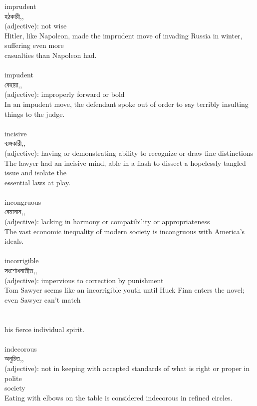 \documentclass{article}
\begin{document}
{imprudent}\\
{হঠকারী,,}\\
{(adjective): not wise\\Hitler, like Napoleon, made the imprudent move of invading Russia in winter, suffering even more\\casualties than Napoleon had.\\}\\
{impudent}\\
{বেহায়া,,}\\
{(adjective): improperly forward or bold\\In an impudent move, the defendant spoke out of order to say terribly insulting things to the judge.\\}\\
{incisive}\\
{ব্যঙ্গকারী,,}\\
{(adjective): having or demonstrating ability to recognize or draw fine distinctions\\The lawyer had an incisive mind, able in a flash to dissect a hopelessly tangled issue and isolate the\\essential laws at play.\\}\\
{incongruous}\\
{বেমানান,,}\\
{(adjective): lacking in harmony or compatibility or appropriateness\\The vast economic inequality of modern society is incongruous with America's ideals.\\}\\
{incorrigible}\\
{সংশোধনাতীত,,}\\
{(adjective): impervious to correction by punishment\\Tom Sawyer seems like an incorrigible youth until Huck Finn enters the novel; even Sawyer can't match\\\\                                                                                \\his fierce individual spirit.\\}\\
{indecorous}\\
{অনুচিত,,}\\
{(adjective): not in keeping with accepted standards of what is right or proper in polite\\society\\Eating with elbows on the table is considered indecorous in refined circles.\\}\\
\end{document}
